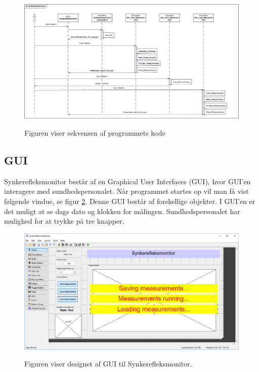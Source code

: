 \begin{figure}[H]
\centering
{\includegraphics[width=\linewidth]
{Figure/SekevensDiagram}}
\caption{Figuren viser sekvensen af programmets kode}
\label{Fig:SekevensDiagram}
\end{figure} 



\subsection{GUI}

Synkerefleksmonitor består af en Graphical User Interfaces (GUI), hvor GUI'en interagere med sundhedspersonalet. Når programmet startes op vil man få vist følgende vindue, se figur \ref{Fig:designGUI}. Denne GUI består af forskellige objekter. I GUI'en er det muligt at se dags dato og klokken for målingen. Sundhedspersonalet har mulighed for at trykke på tre knapper. 

\begin{figure}[H]
\centering
{\includegraphics[width=\linewidth]
{Figure/designGUI}}
\caption{Figuren viser designet af GUI til Synkerefleksmonitor.}
\label{Fig:designGUI}
\end{figure} 

